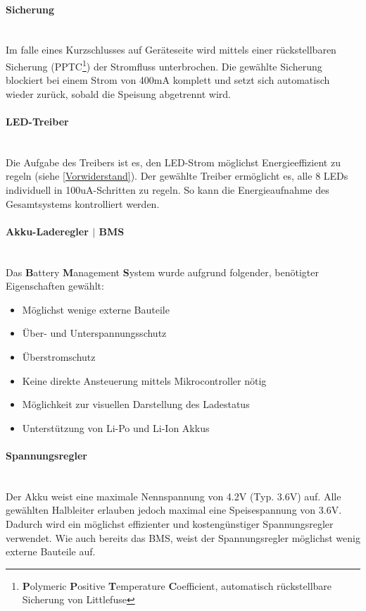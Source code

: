 \documentclass[12pt]{article}
\begin{document}
	\paragraph{Sicherung}\mbox{}\\
	Im falle eines Kurzschlusses auf Geräteseite wird mittels einer rückstellbaren Sicherung (PPTC\footnote{\textbf{P}olymeric \textbf{P}ositive \textbf{T}emperature \textbf{C}oefficient, automatisch rückstellbare Sicherung von Littlefuse}) der Stromfluss unterbrochen. Die gewählte Sicherung blockiert bei einem Strom von 400mA komplett und setzt sich automatisch wieder zurück, sobald die Speisung abgetrennt wird.
	\paragraph{LED-Treiber} \mbox{}\\
	Die Aufgabe des Treibers ist es, den LED-Strom möglichst Energieeffizient zu regeln (siehe \ref{Vorwiderstand}). Der gewählte Treiber ermöglicht es, alle 8 LEDs individuell in 100uA-Schritten zu regeln. So kann die Energieaufnahme des Gesamtsystems kontrolliert werden.
	\paragraph{Akku-Laderegler $\vert$ BMS} \mbox{}\\
	Das \textbf{B}attery \textbf{M}anagement \textbf{S}ystem wurde aufgrund folgender, benötigter Eigenschaften gewählt:
	\begin{itemize}
		\item Möglichst wenige externe Bauteile
		\item Über- und Unterspannungsschutz
		\item Überstromschutz
		\item Keine direkte Ansteuerung mittels Mikrocontroller nötig
		\item Möglichkeit zur visuellen Darstellung des Ladestatus
		\item Unterstützung von Li-Po und Li-Ion Akkus
	\end{itemize}
	\paragraph{Spannungsregler} \mbox{}\\
	Der Akku weist eine maximale Nennspannung von 4.2V (Typ. 3.6V) auf. Alle gewählten Halbleiter erlauben jedoch maximal eine Speisespannung von 3.6V. Dadurch wird ein möglichst effizienter und kostengünstiger Spannungsregler verwendet. Wie auch bereits das BMS, weist der Spannungsregler möglichst wenig externe Bauteile auf.
\end{document}
